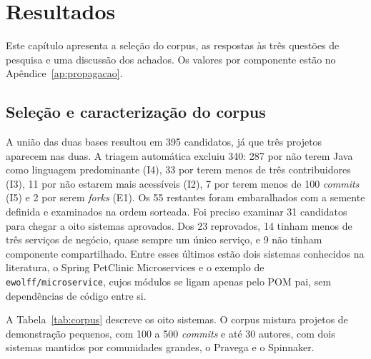 \chapter{Resultados}
\label{cap:resultados}

Este capítulo apresenta a seleção do corpus, as respostas às três questões de pesquisa e uma discussão dos achados. Os valores por componente estão no Apêndice~\ref{ap:propagacao}.

\section{Seleção e caracterização do corpus}
\label{sec:res-corpus}

A união das duas bases resultou em 395 candidatos, já que três projetos aparecem nas duas. A triagem automática excluiu 340: 287 por não terem Java como linguagem predominante (I4), 33 por terem menos de três contribuidores (I3), 11 por não estarem mais acessíveis (I2), 7 por terem menos de 100 \textit{commits} (I5) e 2 por serem \textit{forks} (E1). Os 55 restantes foram embaralhados com a semente definida e examinados na ordem sorteada. Foi preciso examinar 31 candidatos para chegar a oito sistemas aprovados. Dos 23 reprovados, 14 tinham menos de três serviços de negócio, quase sempre um único serviço, e 9 não tinham componente compartilhado. Entre esses últimos estão dois sistemas conhecidos na literatura, o Spring PetClinic Microservices e o exemplo de \texttt{ewolff/microservice}, cujos módulos se ligam apenas pelo POM pai, sem dependências de código entre si.

A Tabela~\ref{tab:corpus} descreve os oito sistemas. O corpus mistura projetos de demonstração pequenos, com 100 a 500 \textit{commits} e até 30 autores, com dois sistemas mantidos por comunidades grandes, o Pravega e o Spinnaker.

